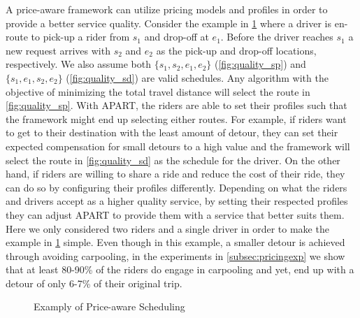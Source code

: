 A price-aware framework can utilize pricing models and profiles in order to provide a better service quality. Consider the example in \cref{fig:quality_eg} where a driver is en-route to pick-up a rider from $s_1$ and drop-off at $e_1$. Before the driver reaches $s_1$ a new request arrives with $s_2$ and $e_2$ as the pick-up and drop-off locations, respectively. We also assume both $\lbrace s_1, s_2, e_1, e_2 \rbrace$ (\cref{fig:quality_sp}) and $\lbrace s_1, e_1, s_2, e_2 \rbrace$ (\cref{fig:quality_sd}) are valid schedules. Any algorithm with the objective of minimizing the total travel distance will select the route in \cref{fig:quality_sp}. With APART, the riders are able to set their profiles such that the framework might end up selecting either routes. For example, if riders want to get to their destination with the least amount of detour, they can set their expected compensation for small detours to a high value and the framework will select the route in \cref{fig:quality_sd} as the schedule for the driver. On the other hand, if riders are willing to share a ride and reduce the cost of their ride, they can do so by configuring their profiles differently. Depending on what the riders and drivers accept as a higher quality service, by setting their respected profiles they can adjust APART to provide them with a service that better suits them. Here we only considered two riders and a single driver in order to make the example in \cref{fig:quality_eg} simple. Even though in this example, a smaller detour is achieved through avoiding carpooling, in the experiments in \cref{subsec:pricingexp} we show that at least 80-90\% of the riders do engage in carpooling and yet, end up with a detour of only 6-7\% of their original trip.

\begin{figure}[!ht]
	\centering
	\vspace{-2mm}\caption{Examply of Price-aware Scheduling} \vspace{-2mm} \label{fig:quality_eg}
\end{figure}\vspace{-0mm}

